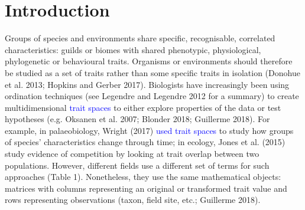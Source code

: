 \documentclass[]{article}
\begin{document}
\section{Introduction}\label{introduction}

Groups of species and environments share specific, recognisable,
correlated characteristics: guilds or biomes with shared phenotypic,
physiological, phylogenetic or behavioural traits. Organisms or
environments should therefore be studied as a set of traits rather than
some specific traits in isolation (Donohue et al. 2013; Hopkins and
Gerber 2017). Biologists have increasingly been using ordination
techniques (see Legendre and Legendre 2012 for a summary) to create
multidimensional \textcolor{blue}{trait spaces} to either
explore properties of the data or test hypotheses (e.g. Oksanen et al.
2007; Blonder 2018; Guillerme 2018). For example, in palaeobiology,
Wright (2017) \textcolor{blue}{used trait spaces} to study
how groups of species' characteristics change through time; in ecology,
Jones et al. (2015) study evidence of competition by looking at trait
overlap between two populations. However, different fields use a
different set of terms for such approaches (Table 1). Nonetheless, they
use the same mathematical objects: matrices with columns representing an
original or transformed trait value and rows representing observations
(taxon, field site, etc.; Guillerme 2018).


\renewcommand\baselinestretch{1}\selectfont
\end{document}
